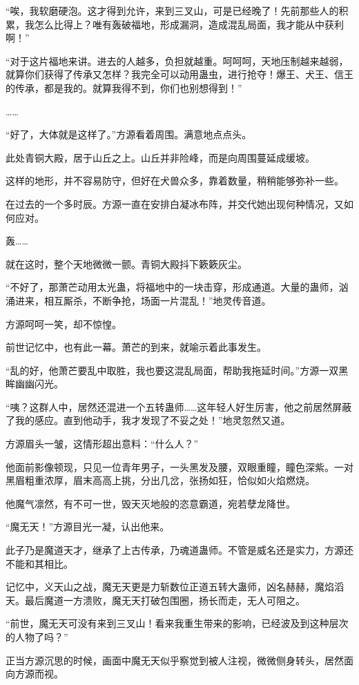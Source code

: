 \begin{this_body}
“唉，我软磨硬泡。这才得到允许，来到三叉山，可是已经晚了！先前那些人的积累，我怎么比得上？唯有轰破福地，形成漏洞，造成混乱局面，我才能从中获利啊！”

“对于这片福地来讲。进去的人越多，负担就越重。呵呵呵，天地压制越来越弱，就算你们获得了传承又怎样？我完全可以动用蛊虫，进行抢夺！爆王、犬王、信王的传承，都是我的。就算我得不到，你们也别想得到！”

……

“好了，大体就是这样了。”方源看着周围。满意地点点头。

此处青铜大殿，居于山丘之上。山丘并非险峰，而是向周围蔓延成缓坡。

这样的地形，并不容易防守，但好在犬兽众多，靠着数量，稍稍能够弥补一些。

在过去的一个多时辰。方源一直在安排白凝冰布阵，并交代她出现何种情况，又如何应对。

轰……

就在这时，整个天地微微一颤。青铜大殿抖下簌簌灰尘。

“不好了，那萧芒动用太光蛊，将福地中的一块击穿，形成通道。大量的蛊师，汹涌进来，相互厮杀，不断争抢，场面一片混乱！”地灵传音道。

方源呵呵一笑，却不惊惶。

前世记忆中，也有此一幕。萧芒的到来，就喻示着此事发生。

“乱的好，他萧芒要乱中取胜，我也要这混乱局面，帮助我拖延时间。”方源一双黑眸幽幽闪光。

“咦？这群人中，居然还混进一个五转蛊师……这年轻人好生厉害，他之前居然屏蔽了我的感应。直到他动手，我才发现了不妥之处！”地灵忽然又道。

方源眉头一皱，这情形超出意料：“什么人？”

他面前影像顿现，只见一位青年男子，一头黑发及腰，双眼重瞳，瞳色深紫。一对黑眉粗重浓厚，眉末高高上挑，分出几岔，张扬如狂，恰似如火焰燃烧。

他魔气凛然，有不可一世，毁天灭地般的恣意霸道，宛若孽龙降世。

“魔无天！”方源目光一凝，认出他来。

此子乃是魔道天才，继承了上古传承，乃魂道蛊师。不管是威名还是实力，方源还不能和其相比。

记忆中，义天山之战，魔无天更是力斩数位正道五转大蛊师，凶名赫赫，魔焰滔天。最后魔道一方溃败，魔无天打破包围圈，扬长而走，无人可阻之。

“前世，魔无天可没有来到三叉山！看来我重生带来的影响，已经波及到这种层次的人物了吗？”

正当方源沉思的时候，画面中魔无天似乎察觉到被人注视，微微侧身转头，居然面向方源而视。


\end{this_body}
